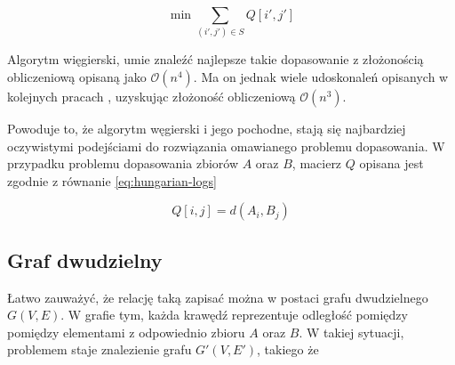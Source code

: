 \begin{equation}
  \min \sum_{(i', j') \in S} Q[i', j']\label{eq:hungarian-goal}
\end{equation}

Algorytm więgierski, umie znaleźć najlepsze takie dopasowanie z złożonością
obliczeniową opisaną jako $\mathcal{O}(n^4)$.
Ma on jednak wiele udoskonaleń opisanych w kolejnych pracach
\cite{Hungarian-o3-1}\cite{Hungarian-o3-2}, uzyskując złożoność obliczeniową
$\mathcal{O}(n^3)$.

Powoduje to, że algorytm węgierski i jego pochodne, stają się najbardziej
oczywistymi podejściami do rozwiązania omawianego problemu dopasowania.
W przypadku problemu dopasowania zbiorów $A$ oraz $B$, macierz $Q$ opisana jest
zgodnie z równanie \ref{eq:hungarian-logs}

\begin{equation}
  Q[i, j] = d(A_i, B_j)\label{eq:hungarian-logs}
\end{equation}

\todo{}

\subsection{Graf dwudzielny}

Łatwo zauważyć, że relację taką zapisać można w postaci grafu dwudzielnego $G(V, E)$.
W grafie tym, każda krawędź reprezentuje odległość pomiędzy pomiędzy elementami
z odpowiednio zbioru $A$ oraz $B$.
W takiej sytuacji, problemem staje znalezienie grafu $G'(V, E')$, takiego że \todo{}
